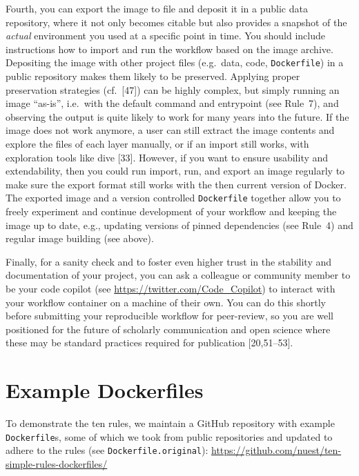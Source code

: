 \documentclass[10pt,letterpaper]{article}
\begin{document}
Fourth, you can export the image to file and deposit it in a public data
repository, where it not only becomes citable but also provides a
snapshot of the \emph{actual} environment you used at a specific point
in time. You should include instructions how to import and run the
workflow based on the image archive. Depositing the image with other
project files (e.g.~data, code, \texttt{Dockerfile}) in a public
repository makes them likely to be preserved. Applying proper
preservation strategies (cf.~{[}47{]}) can be highly complex, but simply
running an image ``as-is'', i.e.~with the default command and entrypoint
(see Rule~7), and observing the output is quite likely to work for many
years into the future. If the image does not work anymore, a user can
still extract the image contents and explore the files of each layer
manually, or if an import still works, with exploration tools like dive
{[}33{]}. However, if you want to ensure usability and extendability,
then you could run import, run, and export an image regularly to make
sure the export format still works with the then current version of
Docker. The exported image and a version controlled \texttt{Dockerfile}
together allow you to freely experiment and continue development of your
workflow and keeping the image up to date, e.g., updating versions of
pinned dependencies (see Rule~4) and regular image building (see above).

Finally, for a sanity check and to foster even higher trust in the
stability and documentation of your project, you can ask a colleague or
community member to be your code copilot (see
\url{https://twitter.com/Code_Copilot}) to interact with your workflow
container on a machine of their own. You can do this shortly before
submitting your reproducible workflow for peer-review, so you are well
positioned for the future of scholarly communication and open science
where these may be standard practices required for publication
{[}20,51--53{]}.

\hypertarget{example-dockerfiles}{%
\section{Example Dockerfiles}\label{example-dockerfiles}}

To demonstrate the ten rules, we maintain a GitHub repository with
example \texttt{Dockerfile}s, some of which we took from public
repositories and updated to adhere to the rules (see
\texttt{Dockerfile.original}):
\url{https://github.com/nuest/ten-simple-rules-dockerfiles/}
\end{document}
